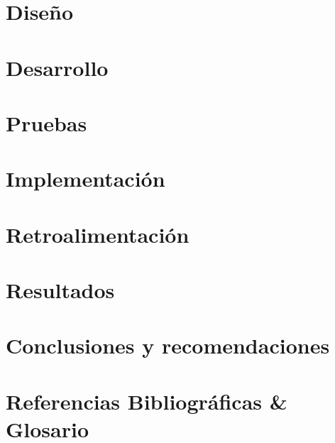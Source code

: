 \documentclass[12pt]{book} %
\begin{document}
\section{Diseño}

\section{Desarrollo}

\section{Pruebas}

\section{Implementación}

\section{Retroalimentación}

\section{Resultados}

\section{Conclusiones y recomendaciones}

\section{Referencias Bibliográficas \& Glosario} 	
\newpage
\printnoidxglossaries
{}
\end{document}

